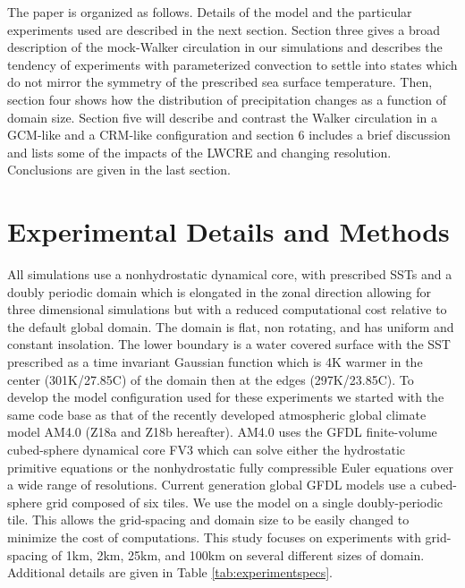 \documentclass[draft]{agujournal2019}
\begin{document}
The paper is organized as follows.  Details of the model and the particular experiments used are described
in the next section. Section three gives a broad description of the mock-Walker circulation in our simulations and
describes the tendency of experiments with parameterized convection 
to settle into states which do not mirror the symmetry of the prescribed sea surface temperature.   
Then, section four shows how the distribution of precipitation changes as a function of domain size.  
Section five will describe and contrast the Walker circulation in a GCM-like and a CRM-like configuration and
section 6 includes a brief discussion and lists some of the impacts of the LWCRE and changing 
resolution.  Conclusions are given in the last section.   

\section{Experimental Details and Methods}

All simulations use a nonhydrostatic dynamical core, with prescribed SSTs and a doubly periodic domain which is elongated in the zonal 
direction allowing for three dimensional simulations but with a reduced computational cost relative to the default global domain.  
The domain is flat, non rotating, and has uniform and constant insolation.
The lower boundary is a water covered surface with the SST prescribed as a time invariant Gaussian function 
which is 4K warmer in the center (301K/27.85C) of the domain then 
at the edges (297K/23.85C).  
To develop the model configuration used for these experiments we started with the same code base as that of the 
recently developed atmospheric global climate model AM4.0 \cite{Zhao_etal18a, Zhao_etal18b} (Z18a and Z18b hereafter).
AM4.0 uses the GFDL finite-volume cubed-sphere dynamical core FV3 \cite{Harris_Lin_2013}
which can solve either the hydrostatic primitive equations or the nonhydrostatic fully compressible Euler equations over a wide range of resolutions.   
Current generation global GFDL models use a cubed-sphere grid composed of six tiles.  We use the model on a single doubly-periodic
tile.  This allows the grid-spacing and domain size to be easily changed to minimize the cost of computations.
This study focuses on experiments with grid-spacing of 1km, 2km, 25km, and 100km on several different
sizes of domain.  Additional details are given in Table \ref{tab:experimentspecs}.  
\end{document}
